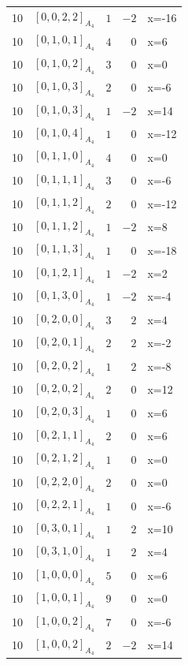 \documentclass[11pt]{article}
\newcommand{\Dynkin}[1]{#1}
\begin{document}
\begin{longtable}{r l r r l}
10 & $\Dynkin{[0,0,2,2]_{A_4}}$ & $1$ & $-2$ & x=-16\\
10 & $\Dynkin{[0,1,0,1]_{A_4}}$ & $4$ & $0$ & x=6\\
10 & $\Dynkin{[0,1,0,2]_{A_4}}$ & $3$ & $0$ & x=0\\
10 & $\Dynkin{[0,1,0,3]_{A_4}}$ & $2$ & $0$ & x=-6\\
10 & $\Dynkin{[0,1,0,3]_{A_4}}$ & $1$ & $-2$ & x=14\\
10 & $\Dynkin{[0,1,0,4]_{A_4}}$ & $1$ & $0$ & x=-12\\
10 & $\Dynkin{[0,1,1,0]_{A_4}}$ & $4$ & $0$ & x=0\\
10 & $\Dynkin{[0,1,1,1]_{A_4}}$ & $3$ & $0$ & x=-6\\
10 & $\Dynkin{[0,1,1,2]_{A_4}}$ & $2$ & $0$ & x=-12\\
10 & $\Dynkin{[0,1,1,2]_{A_4}}$ & $1$ & $-2$ & x=8\\
10 & $\Dynkin{[0,1,1,3]_{A_4}}$ & $1$ & $0$ & x=-18\\
10 & $\Dynkin{[0,1,2,1]_{A_4}}$ & $1$ & $-2$ & x=2\\
10 & $\Dynkin{[0,1,3,0]_{A_4}}$ & $1$ & $-2$ & x=-4\\
10 & $\Dynkin{[0,2,0,0]_{A_4}}$ & $3$ & $2$ & x=4\\
10 & $\Dynkin{[0,2,0,1]_{A_4}}$ & $2$ & $2$ & x=-2\\
10 & $\Dynkin{[0,2,0,2]_{A_4}}$ & $1$ & $2$ & x=-8\\
10 & $\Dynkin{[0,2,0,2]_{A_4}}$ & $2$ & $0$ & x=12\\
10 & $\Dynkin{[0,2,0,3]_{A_4}}$ & $1$ & $0$ & x=6\\
10 & $\Dynkin{[0,2,1,1]_{A_4}}$ & $2$ & $0$ & x=6\\
10 & $\Dynkin{[0,2,1,2]_{A_4}}$ & $1$ & $0$ & x=0\\
10 & $\Dynkin{[0,2,2,0]_{A_4}}$ & $2$ & $0$ & x=0\\
10 & $\Dynkin{[0,2,2,1]_{A_4}}$ & $1$ & $0$ & x=-6\\
10 & $\Dynkin{[0,3,0,1]_{A_4}}$ & $1$ & $2$ & x=10\\
10 & $\Dynkin{[0,3,1,0]_{A_4}}$ & $1$ & $2$ & x=4\\
10 & $\Dynkin{[1,0,0,0]_{A_4}}$ & $5$ & $0$ & x=6\\
10 & $\Dynkin{[1,0,0,1]_{A_4}}$ & $9$ & $0$ & x=0\\
10 & $\Dynkin{[1,0,0,2]_{A_4}}$ & $7$ & $0$ & x=-6\\
10 & $\Dynkin{[1,0,0,2]_{A_4}}$ & $2$ & $-2$ & x=14\\

\end{longtable}
\end{document}
